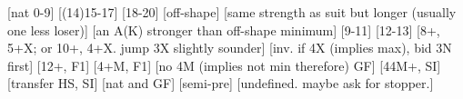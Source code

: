 \begin{bidsemi}
[nat 0-9]
    [(14)15-17]
    [18-20]
    [off-shape]
    [same strength as suit but longer (usually one less loser)]
    [an A(K) stronger than off-shape minimum]
[9-11]
[12-13]
[8+, 5+X; or 10+, 4+X. jump 3X slightly sounder]
    [inv. if 4X (implies max), bid 3N first]
[12+, F1]
    [4+M, F1]
    [no 4M (implies not min therefore) GF]
    [44M+, SI]
    [transfer HS, SI]
    [nat and GF]
[semi-pre]
[undefined. maybe ask for stopper.]
\end{bidsemi}